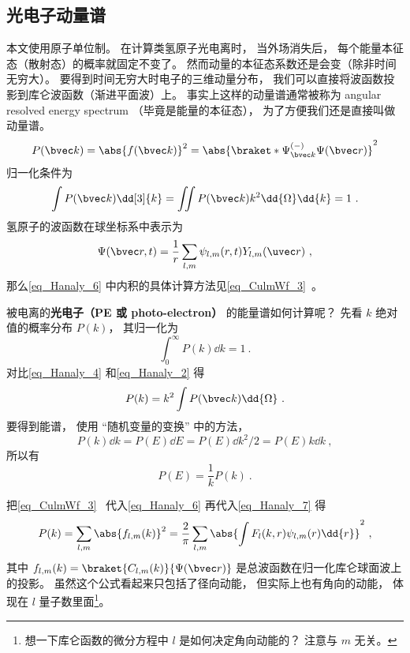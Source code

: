 

\subsection{光电子动量谱}

本文使用原子单位制。 在计算类氢原子光电离时， 当外场消失后， 每个能量本征态（散射态）的概率就固定不变了。 然而动量的本征态系数还是会变（除非时间无穷大）。 要得到时间无穷大时电子的三维动量分布， 我们可以直接将波函数投影到库仑波函数（渐进平面波）上。 事实上这样的动量谱通常被称为 angular resolved energy spectrum （毕竟是能量的本征态）， 为了方便我们还是直接叫做动量谱。
\begin{equation}\label{eq_Hanaly_6}
P(\bvec k) = \abs{f(\bvec k)}^2 = \abs{\braket*{\Psi^{(-)}_{\bvec k}}{\Psi(\bvec r)}}^2
\end{equation}
归一化条件为
\begin{equation}\label{eq_Hanaly_4}
\int P(\bvec k) \dd[3]{k} = \iint P(\bvec k) k^2\dd{\Omega}\dd{k} = 1~.
\end{equation}
氢原子的波函数在球坐标系中表示为
\begin{equation}
\Psi(\bvec r, t) = \frac{1}{r}\sum_{l,m} \psi_{l,m}(r, t) Y_{l,m}(\uvec r)~,
\end{equation}
那么\autoref{eq_Hanaly_6} 中内积的具体计算方法见\autoref{eq_CulmWf_3}~。

被电离的\textbf{光电子（PE 或 photo-electron）} 的能量谱如何计算呢？ 先看 $k$ 绝对值的概率分布 $P(k)$， 其归一化为
\begin{equation}\label{eq_Hanaly_2}
\int_0^\infty P(k) \dd{k} = 1~.
\end{equation}
对比\autoref{eq_Hanaly_4} 和\autoref{eq_Hanaly_2} 得
\begin{equation}\label{eq_Hanaly_7}
P(k) = k^2 \int P(\bvec k) \dd{\Omega}~.
\end{equation}
要得到能谱， 使用 “随机变量的变换” 中的方法，
\begin{equation}\label{eq_Hanaly_1}
P(k)\dd{k} = P(E)\dd{E} = P(E)\dd{k^2/2} = P(E)k\dd{k}~,
\end{equation}
所以有
\begin{equation}
P(E) = \frac{1}{k}P(k)~.
\end{equation}

把\autoref{eq_CulmWf_3}~ 代入\autoref{eq_Hanaly_6} 再代入\autoref{eq_Hanaly_7} 得
\begin{equation}
P(k) = \sum_{l,m} \abs{f_{l,m}(k)}^2 = \frac{2}{\pi} \sum_{l,m} \abs{\int F_l(k, r) \psi_{l,m}(r) \dd{r}}^2~,
\end{equation}
其中 $f_{l,m}(k) = \braket{C_{l,m}(k)}{\Psi(\bvec r)}$ 是总波函数在归一化库仑球面波上的投影。 虽然这个公式看起来只包括了径向动能， 但实际上也有角向的动能， 体现在 $l$ 量子数里面\footnote{想一下库仑函数的微分方程中 $l$ 是如何决定角向动能的？ 注意与 $m$ 无关。}。

